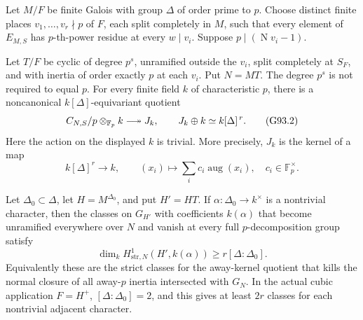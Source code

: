 \begin{theorem}
\label{AC-G93-sector}
Let \(M/F\) be finite Galois with group \(\Delta\) of order prime
to \(p\).  Choose distinct finite places \(v_1,\ldots,v_r\nmid p\)
of \(F\), each split completely in \(M\), such that every element
of \(E_{M,S}\) has \(p\)-th-power residue at every \(w\mid v_i\).
Suppose \(p\mid(\operatorname N v_i-1)\).

Let \(T/F\) be cyclic of degree \(p^s\), unramified outside the
\(v_i\), split completely at \(S_F\), and with inertia of order
exactly \(p\) at each \(v_i\).  Put \(N=MT\).  The degree
\(p^s\) is not required to equal \(p\).
For every finite field \(k\) of characteristic \(p\), there is a
noncanonical \(k[\Delta]\)-equivariant quotient
\[
 C_{N,S}/p\otimes_{\mathbb F_p} k
       \longtwoheadrightarrow J_k,
 \qquad
 J_k\oplus k\simeq k[\Delta]^{\,r}.
 \tag{G93.2}
\]
Here the action on the displayed \(k\) is trivial.  More precisely,
\(J_k\) is the kernel of a map
\[
 k[\Delta]^r\longrightarrow k,
 \qquad (x_i)\longmapsto\sum_i c_i\operatorname{aug}(x_i),
 \quad c_i\in\mathbb F_p^\times.
 \tag{G93.3}
\]

Let \(\Delta_0\subset\Delta\), let \(H=M^{\Delta_0}\), and put
\(H'=HT\).  If \(\alpha:\Delta_0\to k^\times\) is a nontrivial
character, then the classes on \(G_{H'}\) with coefficients
\(k(\alpha)\) that become unramified everywhere over \(N\) and
vanish at every full \(p\)-decomposition group satisfy
\[
 \dim_k H^1_{\mathrm{str},N}(H',k(\alpha))
       \geq r[\Delta:\Delta_0].
 \tag{G93.4}
\]
Equivalently these are the strict classes for the away-kernel
quotient that kills the normal closure of all away-\(p\) inertia
intersected with \(G_N\).  In the actual cubic application
\(F=H^+\), \([\Delta:\Delta_0]=2\), and this gives at least
\(2r\) classes for each nontrivial adjacent character.
\end{theorem}

